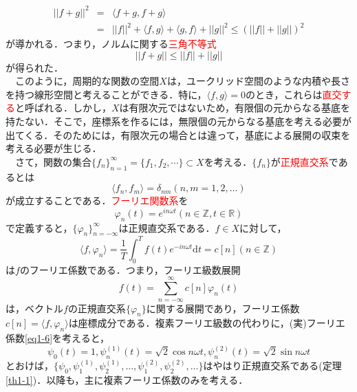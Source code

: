\documentclass[a4j]{jsbook}
\numberwithin{theorem}{chapter}  %
\begin{document}
\begin{eqnarray*}
||f+g||^2&=&\langle f+g, f+g\rangle \\
&=&||f||^2+\langle f, g\rangle+\langle g, f\rangle+||g||^2\leq\left(||f||+||g||\right)^2
\end{eqnarray*}
が導かれる．つまり，ノルムに関する\textcolor{red}{三角不等式}
\begin{equation}
    ||f+g||\leq ||f||+||g|| \label{eq1-19}
\end{equation}
が得られた．\\
　このように，周期的な関数の空間\(X\)は，ユークリッド空間のような内積や長さを持つ線形空間と考えることができる．特に，\(\langle f, g\rangle=0\)のとき，これらは\textcolor{red}{直交する}と呼ばれる．しかし，\(X\)は有限次元ではないため，有限個の元からなる基底を持たない．そこで，座標系を作るには，無限個の元からなる基底を考える必要が出てくる．そのためには，有限次元の場合とは違って，基底による展開の収束を考える必要が生じる．\\
　さて，関数の集合\(\{f_n\}_{n=1}^\infty=\{f_1, f_2, \cdots\}\subset X\)を考える．\(\{f_n\}\)が\textcolor{red}{正規直交系}であるとは
\begin{equation*}
    \langle f_n, f_m\rangle=\delta_{nm} (n, m=1, 2, \dots)
\end{equation*}
が成立することである．\textcolor{red}{フーリエ関数系}を
\begin{equation*}
    \varphi_n(t)=e^{in\omega t} (n\in\mathbb{Z}, t\in\mathbb{R})
\end{equation*}
で定義すると，\(\{\varphi_n\}_{n=-\infty}^\infty\)は正規直交系である．\(f\in X\)に対して，
\begin{equation*}
    \langle f, \varphi_n\rangle=\frac{1}{T}\int_0^T f(t)e^{-in\omega t}\mathrm{d}t=c[n] (n\in\mathbb{Z})
\end{equation*}
は\(f\)のフーリエ係数である．つまり，フーリエ級数展開
\begin{equation*}
    f(t)=\sum_{n=-\infty}^\infty c[n]\varphi_n(t)
\end{equation*}
は，ベクトル\(f\)の正規直交系\(\{\varphi_n\}\)に関する展開であり，フーリエ係数\(c[n]=\langle f, \varphi_n\rangle\)は座標成分である．複素フーリエ級数の代わりに，(実)フーリエ係数\eqref{eq1-6}を考えると，
\begin{equation*}
    \psi_0(t)=1, \psi_n^{(1)}(t)=\sqrt{2}\cos n\omega t, \psi_n^{(2)}(t)=\sqrt{2}\sin n\omega t
\end{equation*}
とおけば，\(\{\psi_0, \psi_1^{(1)}, \psi_2^{(1)}, \dots, \psi_1^{(2)}, \psi_2^{(2)}, \dots\}\)はやはり正規直交系である(定理\ref{th1-1})．以降も，主に複素フーリエ係数のみを考える．
\end{document}
